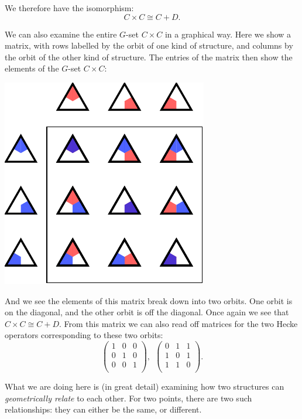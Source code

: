 \documentclass[11pt,oneside]{article}
\begin{document}
We therefore have the isomorphism:
$$
    C\times C \cong C + D.
$$

We can also examine the entire $G$-set $C\times C$ in a graphical way.
Here we show a matrix, with rows labelled by the orbit of one kind of
structure, and columns by the orbit of the other kind of structure.
The entries of the matrix then show the elements of the $G$-set $C\times C:$
\begin{center}
\includegraphics[]{pic-triangle-point-point-matrix.pdf} 
\end{center}
And we see the elements of this matrix break down into two
orbits. One orbit is on the diagonal,
and the other orbit is off the diagonal.
Once again we see that $C\times C \cong C+D.$
From this matrix we can also read off matrices for the two Hecke
operators corresponding to these two orbits:
$$
\left( \begin{array}{ccc}
1 & 0 & 0 \\
0 & 1 & 0 \\
0 & 0 & 1 \\
\end{array} \right),\ \ 
\left( \begin{array}{ccc}
0 & 1 & 1 \\
1 & 0 & 1 \\
1 & 1 & 0 \\
\end{array} \right).
$$

What we are doing here is (in great detail) examining how
two structures can \emph{geometrically relate} to each other.
For two points, there are two such relationships:
they can either be the same, or different.
\end{document}
